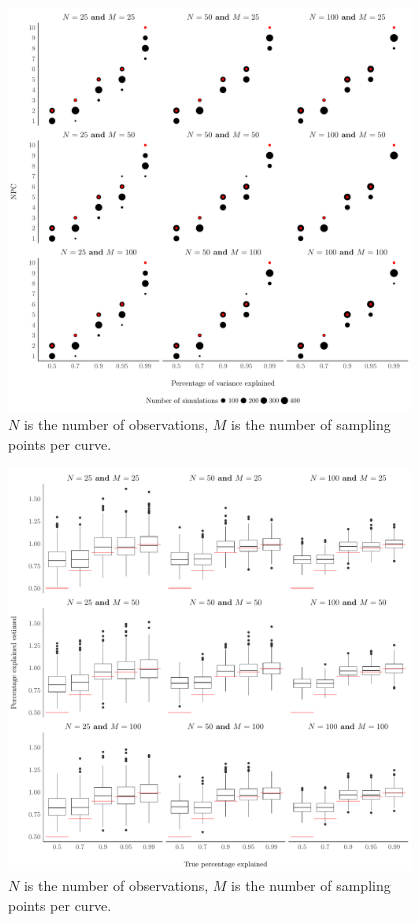 \begin{figure}
     \centering
    \includegraphics[width=0.95\textwidth]{figures/npc_estim.pdf}
    \caption{$N$ is the number of observations, $M$ is the number of sampling points per curve.}
    \label{fig:npc_estim}
\end{figure}

\begin{figure}
     \centering
    \includegraphics[width=0.95\textwidth]{figures/pct_estim.pdf}
    \caption{$N$ is the number of observations, $M$ is the number of sampling points per curve.}
    \label{fig:pct_estim}
\end{figure}